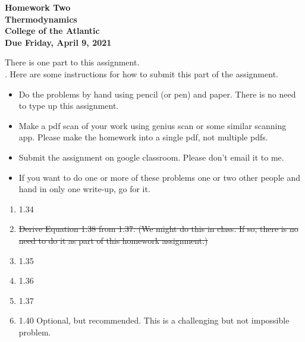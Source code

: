 \documentclass[12pt]{article}
\begin{document}
\pagestyle{empty}
 
\begin{center}
{\LARGE {\bf Homework Two}}\\
\bigskip
{\Large {\bf Thermodynamics}}\\
\bigskip
{\Large {\bf College of the Atlantic}}\\
\bigskip
{ {\bf Due Friday, April 9, 2021}}\\ 
\end{center}
\medskip


\noindent There is one part to this assignment.\\


.  Here are some
instructions for how to submit this part of the assignment.
\begin{itemize}
  \setlength{\itemsep}{1mm}
\item Do the problems by hand using pencil (or pen) and paper.
  There is no need to type up this assignment.
\item Make a pdf scan of your work using genius scan or some
  similar scanning app.  Please make the homework into a single
  pdf, not multiple pdfs.
\item Submit the assignment on google classroom.  Please don't
  email it to me. 
\item If you want to do one or more of these problems one or two other
  people and hand in only one write-up, go for it. 
\end{itemize}


\begin{enumerate}
\setlength{\itemsep}{-1mm}
\item 1.34
\item \sout{Derive Equation 1.38 from 1.37.  (We might do this in class. If
  so, there is no need to do it as part of this homework assignment.)}
\item 1.35
\item 1.36
\item 1.37
\item 1.40 Optional, but recommended. This is a challenging but not
  impossible problem. 

\end{enumerate}
\end{document}
